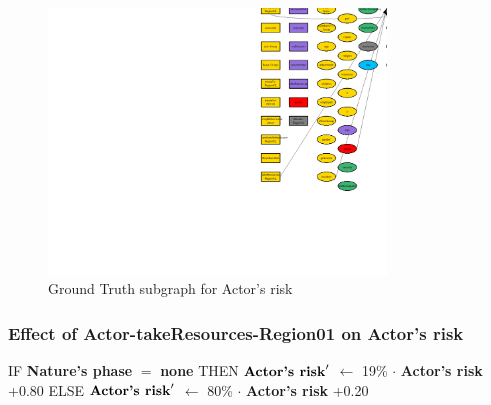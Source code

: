 \documentclass{article}%
\begin{document}
\begin{figure}[ht]%
\centering%
\includegraphics[width=0.8\textwidth]{images/riskOfActor.png}%
\caption{Ground Truth subgraph for Actor's risk}%
\end{figure}

%
\subsubsection{Effect of Actor{-}takeResources{-}Region01 on Actor's risk}%
\label{ssubsec:Effect of Actor{-}takeResources{-}Region01 on Actor's risk}%
\begin{flushleft}%
IF %
\textbf{Nature's phase}%
$=$%
\textbf{none}%
\linebreak%
\hspace*{2em}%
THEN %
$\mbox{\textbf{Actor's risk}} '$%
$\leftarrow$%
19\%%
$\cdot$%
\textbf{Actor's risk}%
+0.80%
\linebreak%
\hspace*{2em}%
ELSE %
$\mbox{\textbf{Actor's risk}} '$%
$\leftarrow$%
80\%%
$\cdot$%
\textbf{Actor's risk}%
+0.20%
\end{flushleft}

%
\end{document}
